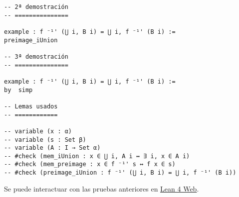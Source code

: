 \begin{verbatim}
-- 2ª demostración
-- ===============

example : f ⁻¹' (⋃ i, B i) = ⋃ i, f ⁻¹' (B i) :=
preimage_iUnion

-- 3ª demostración
-- ===============

example : f ⁻¹' (⋃ i, B i) = ⋃ i, f ⁻¹' (B i) :=
by  simp

-- Lemas usados
-- ============

-- variable (x : α)
-- variable (s : Set β)
-- variable (A : I → Set α)
-- #check (mem_iUnion : x ∈ ⋃ i, A i ↔ ∃ i, x ∈ A i)
-- #check (mem_preimage : x ∈ f ⁻¹' s ↔ f x ∈ s)
-- #check (preimage_iUnion : f ⁻¹' (⋃ i, B i) = ⋃ i, f ⁻¹' (B i))
\end{verbatim}
Se puede interactuar con las pruebas anteriores en \href{https://lean.math.hhu.de/\#url=https://raw.githubusercontent.com/jaalonso/Calculemus2/main/src/Imagen\_inversa\_de\_la\_union\_general.lean}{Lean 4 Web}.

